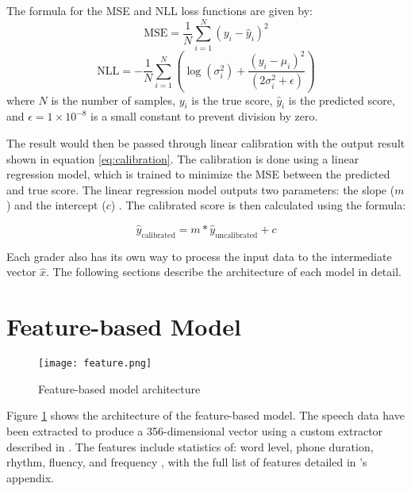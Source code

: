 The formula for the MSE and NLL loss functions are given by:
\begin{equation} \label{eq:mse}
    \text{MSE} = \frac{1}{N} \sum_{i=1}^{N} (y_i - \hat{y}_i)^2
\end{equation}
\begin{equation} \label{eq:nll}
    \text{NLL} = -\frac{1}{N} \sum_{i=1}^{N} \left( \log(\sigma_i^2) + \frac{(y_i - \mu_i)^2}{(2\sigma_i^2 + \epsilon)} \right)
\end{equation}
where $N$ is the number of samples, $y_i$ is the true score,  $\hat{y}_i$ is the predicted score, and $\epsilon = 1\times10^{-8}$ is a small constant to prevent division by zero.

The result would then be passed through linear calibration with the output result shown in equation \ref{eq:calibration}. The calibration is done using a linear regression model, which is trained to minimize the MSE between the predicted and true score. The linear regression model outputs two parameters: the slope ($m$)  and the intercept ($c$) . The calibrated score is then calculated using the formula:

\begin{equation}
    \hat{y}_{\text{calibrated}} = m*\hat{y}_{\text{uncalibrated}} + c
    \label{eq:calibration}
\end{equation}

Each grader also has its own way to process the input data to the intermediate vector $\hat{x}$. The following sections describe the architecture of each model in detail.

\section{Feature-based Model}
\begin{figure}[H]
    \centering
    \texttt{[image: feature.png]}
    \caption{Feature-based model architecture}
    \label{fig:feature}
\end{figure}

Figure \ref{fig:feature} shows the architecture of the feature-based model. The speech data have been extracted to produce a 356-dimensional vector using a custom extractor described in \cite{feature}. The features include statistics of: word level, phone duration, rhythm, fluency, and frequency \cite{graders}, with the full list of features detailed in \cite{feature}'s appendix.

